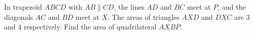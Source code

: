 In trapezoid $ABCD$ with $AB\parallel CD$, the lines $AD$ and $BC$ meet at $P$, and the diagonals $AC$ and $BD$ meet at $X$. The areas of triangles $AXD$ and $DXC$ are $3$ and $4$ respectively. Find the area of quadrilateral $AXBP$.
